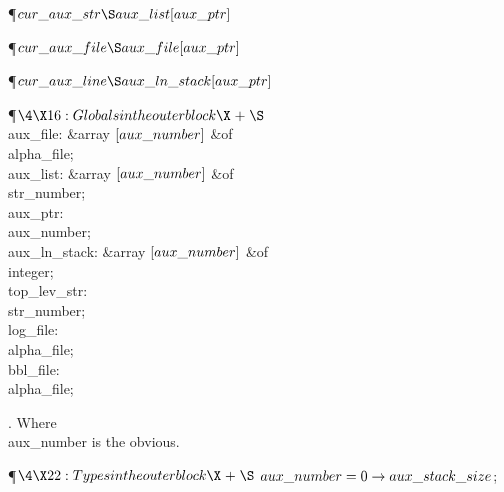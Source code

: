 \Y\P\D {}$\\{cur\_aux\_str}\S\\{aux\_list}[\\{aux\_ptr}]$\par
\P\D {}$\\{cur\_aux\_file}\S\\{aux\_file}[\\{aux\_ptr}]$\par
\P\D {}$\\{cur\_aux\_line}\S\\{aux\_ln\_stack}[\\{aux\_ptr}]$\par
\Y\P$\4\X16:Globals in the outer block\X\mathrel{+}\S$\6
\4\\{aux\_file}: \&{array} $[\\{aux\_number}]$ \1\&{of}\5
\\{alpha\_file};\2\6
\4\\{aux\_list}: \&{array} $[\\{aux\_number}]$ \1\&{of}\5
\\{str\_number};\2\6
\4\\{aux\_ptr}: \\{aux\_number};\6
\4\\{aux\_ln\_stack}: \&{array} $[\\{aux\_number}]$ \1\&{of}\5
\\{integer};\2\6
\4\\{top\_lev\_str}: \\{str\_number};\7
\4\\{log\_file}: \\{alpha\_file};\6
\4\\{bbl\_file}: \\{alpha\_file};\par
\fi

.
Where \\{aux\_number} is the obvious.

\Y\P$\4\X22:Types in the outer block\X\mathrel{+}\S$\6
$\\{aux\_number}=0\to\\{aux\_stack\_size}$;\par
\fi

